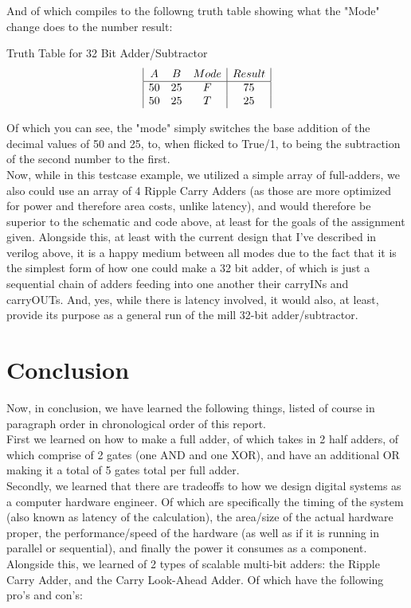 And of which compiles to the followng truth table showing what the "Mode" change does to the number result:
\begin{center}
    Truth Table for 32 Bit Adder/Subtractor
    \begin{displaymath}
    \begin{array}{|c c c|c|}
      A & B & Mode & Result\\
    \hline
      50 & 25 & F & 75 \\
      50 & 25 & T & 25 \\
    \end{array}
    \end{displaymath}
\end{center}

Of which you can see, the "mode" simply switches the base addition of the decimal values of 50 and 25, to, when flicked to True/1, to being the subtraction of the second number to the first.\\

Now, while in this testcase example, we utilized a simple array of full-adders, we also could use an array of 4 Ripple Carry Adders (as those are more optimized for power and therefore area costs, unlike latency), and would therefore be superior to the schematic and code above, at least for the goals of the assignment given. Alongside this, at least with the current design that I've described in verilog above, it is a happy medium between all modes due to the fact that it is the simplest form of how one could make a 32 bit adder, of which is just a sequential chain of adders feeding into one another their carryINs and carryOUTs. And, yes, while there is latency involved, it would also, at least, provide its purpose as a general run of the mill 32-bit adder/subtractor.
\newpage



\section{Conclusion}
Now, in conclusion, we have learned the following things, listed of course in paragraph order in chronological order of this report.\\

First we learned on how to make a full adder, of which takes in 2 half adders, of which comprise of 2 gates (one AND and one XOR), and have an additional OR making it a total of 5 gates total per full adder.\\

Secondly, we learned that there are tradeoffs to how we design digital systems as a computer hardware engineer. Of which are specifically the timing of the system (also known as latency of the calculation), the area/size of the actual hardware proper, the performance/speed of the hardware (as well as if it is running in parallel or sequential), and finally the power it consumes as a component. Alongside this, we learned of 2 types of scalable multi-bit adders: the Ripple Carry Adder, and the Carry Look-Ahead Adder. Of which have the following pro's and con's:\\

